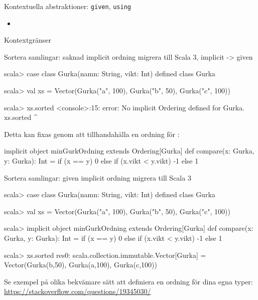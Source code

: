 
 
\begin{Slide}{Kontextuella abstraktioner: \texttt{given}, \texttt{using}}\SlideFontSmall
\begin{itemize}\SlideFontTiny
\item \TODO {} 
\end{itemize}
\end{Slide}

\begin{Slide}{Kontextgränser}
\TODO {}
\end{Slide}





\begin{Slide}{Sortera samlingar: saknad implicit ordning}
\TODO migrera till Scala 3, implicit -> given
\begin{REPL}
scala> case class Gurka(namn: String, vikt: Int)
defined class Gurka

scala> val xs = Vector(Gurka("a", 100), Gurka("b", 50), Gurka("c", 100))

scala> xs.sorted
<console>:15: error: No implicit Ordering defined for Gurka.
       xs.sorted
          ^
\end{REPL}
\pause
Detta kan fixas genom att tillhandahålla en  ordning för :
\begin{Code}
implicit object minGurkOrdning extends Ordering[Gurka] {
  def compare(x: Gurka, y: Gurka): Int =
    if (x == y) 0
    else if (x.vikt < y.vikt) -1
    else 1
}
\end{Code}
\end{Slide}


\begin{Slide}{Sortera samlingar: given implicit ordning}
\TODO migrera till Scala 3

\begin{REPL}
scala> case class Gurka(namn: String, vikt: Int)
defined class Gurka

scala> val xs = Vector(Gurka("a", 100), Gurka("b", 50), Gurka("c", 100))

scala> implicit object minGurkOrdning extends Ordering[Gurka] {
         def compare(x: Gurka, y: Gurka): Int =
           if (x == y) 0
           else if (x.vikt < y.vikt) -1
           else 1
       }

scala> xs.sorted
res0: scala.collection.immutable.Vector[Gurka] =
        Vector(Gurka(b,50), Gurka(a,100), Gurka(c,100))
\end{REPL}
{\SlideFontTiny Se exempel på olika bekvämare sätt att definiera en ordning för dina egna typer: \\
\url{https://stackoverflow.com/questions/19345030/}}
\end{Slide}


